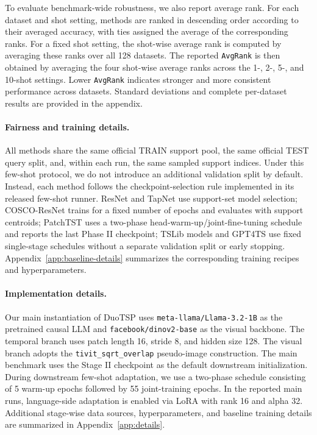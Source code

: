 \documentclass{article}
\begin{document}
To evaluate benchmark-wide robustness, we also report average rank.
For each dataset and shot setting, methods are ranked in descending order according to their averaged accuracy, with ties assigned the average of the corresponding ranks.
For a fixed shot setting, the shot-wise average rank is computed by averaging these ranks over all 128 datasets.
The reported \texttt{AvgRank} is then obtained by averaging the four shot-wise average ranks across the 1-, 2-, 5-, and 10-shot settings.
Lower \texttt{AvgRank} indicates stronger and more consistent performance across datasets.
Standard deviations and complete per-dataset results are provided in the appendix.

\paragraph{Fairness and training details.}
All methods share the same official TRAIN support pool, the same official TEST query split, and, within each run, the same sampled support indices.
Under this few-shot protocol, we do not introduce an additional validation split by default.
Instead, each method follows the checkpoint-selection rule implemented in its released few-shot runner.
ResNet and TapNet use support-set model selection; COSCO-ResNet trains for a fixed number of epochs and evaluates with support centroids; PatchTST uses a two-phase head-warm-up/joint-fine-tuning schedule and reports the last Phase II checkpoint; TSLib models and \textsc{GPT4TS} use fixed single-stage schedules without a separate validation split or early stopping.
Appendix~\ref{app:baseline-details} summarizes the corresponding training recipes and hyperparameters.

\paragraph{Implementation details.}
Our main instantiation of DuoTSP uses \texttt{meta-llama/Llama-3.2-1B} as the pretrained causal LLM and \texttt{facebook/dinov2-base} as the visual backbone.
The temporal branch uses patch length 16, stride 8, and hidden size 128.
The visual branch adopts the \texttt{tivit\_sqrt\_overlap} pseudo-image construction.
The main benchmark uses the Stage II checkpoint as the default downstream initialization.
During downstream few-shot adaptation, we use a two-phase schedule consisting of 5 warm-up epochs followed by 55 joint-training epochs.
In the reported main runs, language-side adaptation is enabled via LoRA with rank 16 and alpha 32.
Additional stage-wise data sources, hyperparameters, and baseline training details are summarized in Appendix~\ref{app:details}.
\end{document}
